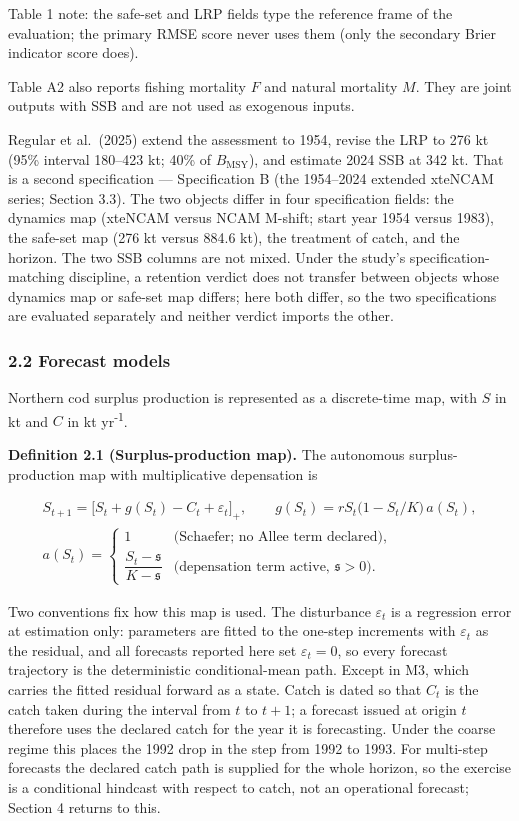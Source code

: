 \documentclass[11pt]{article}
\begin{document}
Table 1 note: the safe-set and LRP fields type the reference frame of
the evaluation; the primary RMSE score never uses them (only the
secondary Brier indicator score does).

Table A2 also reports fishing mortality \(F\) and natural mortality
\(M\). They are joint outputs with SSB and are not used as exogenous
inputs.

Regular et al.~(2025) extend the assessment to 1954, revise the LRP to
276 kt (95\% interval 180--423 kt; 40\% of \(B_{\mathrm{MSY}}\)), and
estimate 2024 SSB at 342 kt. That is a second specification ---
Specification B (the 1954--2024 extended xteNCAM series; Section 3.3).
The two objects differ in four specification fields: the dynamics map
(xteNCAM versus NCAM M-shift; start year 1954 versus 1983), the safe-set
map (276 kt versus 884.6 kt), the treatment of catch, and the horizon.
The two SSB columns are not mixed. Under the study's
specification-matching discipline, a retention verdict does not transfer
between objects whose dynamics map or safe-set map differs; here both
differ, so the two specifications are evaluated separately and neither
verdict imports the other.

\subsubsection{2.2 Forecast models}\label{forecast-models}

Northern cod surplus production is represented as a discrete-time map,
with \(S\) in kt and \(C\) in kt yr\textsuperscript{-1}.

\textbf{Definition 2.1 (Surplus-production map).} The autonomous
surplus-production map with multiplicative depensation is

\[
\begin{gathered}
S_{t+1}=\bigl[S_t+g(S_t)-C_t+\varepsilon_t\bigr]_+,
\qquad
g(S_t)=rS_t\bigl(1-S_t/K\bigr)\,a(S_t),
\\
a(S_t)=
\begin{cases}
1 & \text{(Schaefer; no Allee term declared)},\\[2pt]
\dfrac{S_t-\mathfrak s}{K-\mathfrak s} & \text{(depensation term active, $\mathfrak s>0$)}.
\end{cases}
\end{gathered}
\]

Two conventions fix how this map is used. The disturbance
\(\varepsilon_t\) is a regression error at estimation only: parameters
are fitted to the one-step increments with \(\varepsilon_t\) as the
residual, and all forecasts reported here set \(\varepsilon_t = 0\), so
every forecast trajectory is the deterministic conditional-mean path.
Except in M3, which carries the fitted residual forward as a state.
Catch is dated so that \(C_t\) is the catch taken during the interval
from \(t\) to \(t+1\); a forecast issued at origin \(t\) therefore
uses the declared catch for the year it is forecasting. Under the
coarse regime this places the 1992 drop in the step from 1992 to 1993.
For multi-step forecasts the declared catch path is supplied for the
whole horizon, so the exercise is a conditional hindcast with respect to
catch, not an operational forecast; Section 4 returns to this.
\end{document}
